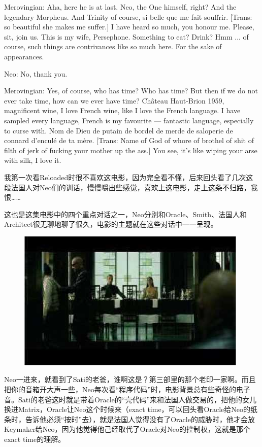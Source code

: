 \documentclass[UTF8]{ctexart}
\newenvironment{myquote}{\color{green} \setlength{\leftskip}{6em} \setlength{\rightskip}{4em} \setlength{\parindent}{-2em}}{\par}
\begin{document}
\begin{myquote}
Merovingian: Aha, here he is at last. Neo, the One himself, right? And the legendary Morpheus. And Trinity of course, si belle que me fait souffrir. [Trans: so beautiful she makes me suffer.] I have heard so much, you honour me. Please, sit, join us. This is my wife, Persephone. Something to eat? Drink? Hmm ... of course, such things are contrivances like so much here. For the sake of appearances.

Neo: No, thank you.

Merovingian: Yes, of course, who has time? Who has time? But then if we do not ever take time, how can we ever have time? Château Haut-Brion 1959, magnificent wine, I love French wine, like I love the French language. I have sampled every language, French is my favourite --- fantastic language, especially to curse with. Nom de Dieu de putain de bordel de merde de saloperie de connard d'enculé de ta mère. [Trans: Name of God of whore of brothel of shit of filth of jerk of fucking your mother up the ass.] You see, it's like wiping your arse with silk, I love it.
\end{myquote}

我第一次看Reloaded时很不喜欢这电影，因为完全看不懂，后来回头看了几次这段法国人对Neo们的训话，慢慢嚼出些感觉，喜欢上这电影，走上这条不归路，我恨……

这也是这集电影中的四个重点对话之一，Neo分别和Oracle、Smith、法国人和Architect很无聊地聊了很久，电影的主题就在这些对话中一一呈现。

\begin{figure}[htb]
\centering
\includegraphics[width=0.5\linewidth]{fig/read_reloaded-90}
\end{figure}

Neo一进来，就看到了Sati的老爸，谁啊这是？第三部里的那个老印一家啊。而且把你的音箱开大声一些，Neo每次看“程序代码”时，电影背景总有些奇怪的电子音。Sati的老爸这时就是带着Oracle的“壳代码”来和法国人做交易的，把他的女儿换进Matrix，Oracle让Neo这个时候来（exact time，可以回头看Oracle给Neo的纸条时，告诉他必须“按时”去），就是法国人觉得没有了Oracle的烕胁时，他才会放Keymaker给Neo，因为他觉得他己经取代了Oracle对Neo的控制权，这就是那个exact time的理解。
\end{document}
